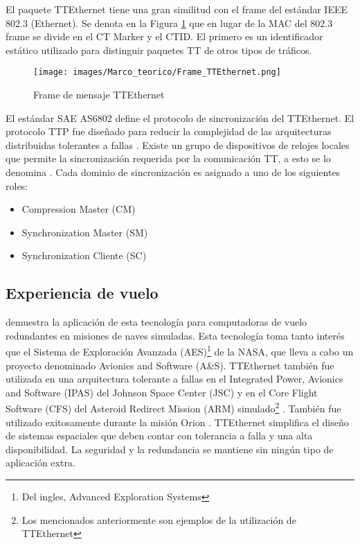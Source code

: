 El paquete TTEthernet tiene una gran similitud con el frame del estándar IEEE 802.3 (Ethernet). Se denota en la Figura \ref{fig:Frame_TTEthernet} que en lugar de la MAC del 802.3 frame se divide en el CT Marker y el CTID. El primero es un identificador estático utilizado para distinguir paquetes \ac{TT} de otros tipos de tráficos.

\begin{figure}[h]
 \centering
 \texttt{[image: images/Marco\_teorico/Frame\_TTEthernet.png]}
  \caption{Frame de mensaje TTEthernet}
\label{fig:Frame_TTEthernet}
\end{figure}

El estándar SAE AS6802 define el protocolo de sincronización del TTEthernet. El protocolo TTP fue diseñado para reducir la complejidad de las arquitecturas distribuidas tolerantes a fallas \citep{TTTechWeb}. Existe un grupo de dispositivos de relojes locales que permite la sincronización requerida por la comunicación \ac{TT}, a esto se lo denomina  \citep{Loveless15}. Cada dominio de sincronización es asignado a uno de los siguientes roles:
\begin{itemize}
	\item Compression Master (CM)
	\item Synchronization Master (SM)
	\item Synchronization Cliente (SC)
\end{itemize}

\subsection{Experiencia de vuelo}
\cite{Loveless15} demuestra la aplicación de esta tecnología para computadoras de vuelo redundantes en misiones de naves simuladas. Esta tecnología toma tanto interés que el Sistema de Exploración Avanzada (AES)\footnote{Del ingles, Advanced Exploration Systems} de la \ac{NASA}, que lleva a cabo un proyecto denominado Avionics and Software (A&S). TTEthernet también fue utilizada en una arquitectura tolerante a fallas en el Integrated Power, Avionics and Software (IPAS)  del Johnson Space Center (JSC) y en el Core Flight Software (CFS) del Asteroid Redirect Mission (ARM) simulado\footnote{Los mencionados anteriormente son ejemplos de la utilización de TTEthernet} \citep{Loveless15}. También fue utilizado exitosamente durante la misión Orion \citep{TTTechOrion} .
TTEthernet simplifica el diseño de sistemas espaciales que deben contar con tolerancia a falla y una alta disponibilidad. La seguridad y la redundancia se mantiene sin ningún tipo de aplicación extra.
